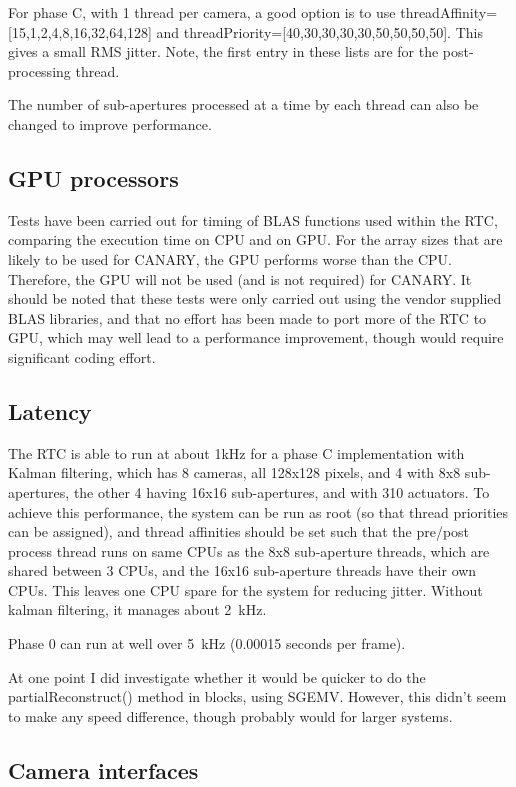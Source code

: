 \documentclass[a4,10pt]{article}
\begin{document}
For phase C, with 1 thread per camera, a good option is to use
threadAffinity=[15,1,2,4,8,16,32,64,128] and
threadPriority=[40,30,30,30,30,50,50,50,50].  This gives a small RMS jitter.
Note, the first entry in these lists are for the post-processing
thread.

The number of sub-apertures processed at a time by each thread can
also be changed to improve performance.


\subsection{GPU processors}
Tests have been carried out for timing of BLAS functions used within
the RTC, comparing the execution time on CPU and on GPU.  For the
array sizes that are likely to be used for CANARY, the GPU performs
worse than the CPU.  Therefore, the GPU will not be used (and is not
required) for CANARY.  It should be noted that these tests were only
carried out using the vendor supplied BLAS libraries, and that no
effort has been made to port more of the RTC to GPU, which may well
lead to a performance improvement, though would require significant
coding effort.


\subsection{Latency}
The RTC is able to run at about 1kHz for a phase C implementation with
Kalman filtering, which
has 8 cameras, all 128x128 pixels, and 4 with 8x8 sub-apertures, the
other 4 having 16x16 sub-apertures, and with 310 actuators.  To
achieve this performance, the system can be run as root (so that
thread priorities can be assigned), and thread affinities should be
set such that the pre/post process thread runs on same CPUs as the 8x8
sub-aperture threads, which are shared between 3 CPUs, and the 16x16
sub-aperture threads have their own CPUs.  This leaves one CPU spare
for the system for reducing jitter.  Without kalman filtering, it
manages about 2~kHz.

Phase 0 can run at well over 5~kHz (0.00015 seconds per frame).

At one point I did investigate whether it would be quicker to do the
partialReconstruct() method in blocks, using SGEMV.  However, this
didn't seem to make any speed difference, though probably would for larger systems.

\subsection{Camera interfaces}
\end{document}
